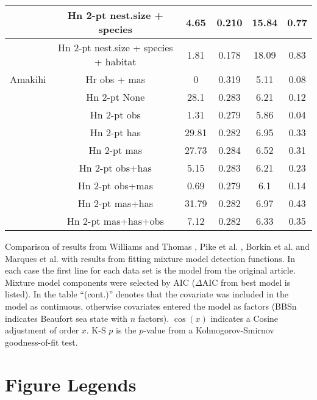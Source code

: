 \documentclass[10pt]{article}
\begin{document}
\begin{table}[!ht]
\begin{tabular}{| c | c | c | c | c | c |}
 \hline
 & Hn 2-pt nest.size + species                     &  4.65   &  0.210  &  15.84  &  0.77 \\
 \hline
 & Hn 2-pt nest.size + species + habitat  &  1.81   &  0.178  &  18.09  &  0.83 \\
\hline
Amakihi  & Hr obs + mas & 0 &  0.319 & 5.11 & 0.08\\ %
\hline
 & Hn 2-pt None                                    &  28.1   &  0.283  &  6.21  &  0.12 \\
\hline
 & Hn 2-pt obs                            &  1.31   &  0.279  &  5.86  &  0.04 \\
\hline
 & Hn 2-pt has                            &  29.81  &  0.282  &  6.95  &  0.33 \\
\hline
 & Hn 2-pt mas                            &  27.73  &  0.284  &  6.52  &  0.31 \\
\hline
 & Hn 2-pt obs+has               &  5.15   &  0.283  &  6.21  &  0.23 \\
\hline
 & Hn 2-pt obs+mas               &  0.69   &  0.279  &  6.1  &  0.14 \\
\hline
 & Hn 2-pt mas+has               &  31.79  &  0.282  &  6.97  &  0.43 \\
\hline
 & Hn 2-pt mas+has+obs  &  7.12  &  0.282  &  6.33  &  0.35 \\
\hline
\end{tabular}
\begin{flushleft}Comparison of results from Williams and Thomas \cite{Williams:2007tc}, Pike et al. \cite{Pike:2003ug}, Borkin et al. \cite{Borkin:2012vj} and Marques et al. \cite{Marques:2007vm} with results from fitting mixture model detection functions. In each case the first line for each data set is the model from the original article. Mixture model components were selected by AIC ($\Delta$AIC from best model is listed). In the table ``(cont.)'' denotes that the covariate was included in the model as continuous, otherwise covariates entered the model as factors (BBSn indicates Beaufort sea state with $n$ factors). $\cos(x)$ indicates a Cosine adjustment of order $x$. K-S $p$ is the $p$-value from a Kolmogorov-Smirnov goodness-of-fit test.
\end{flushleft}
\label{williams-pike-table}
\end{table}




\section*{Figure Legends}
\end{document}
